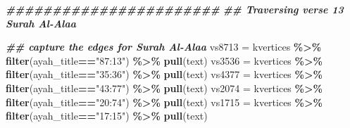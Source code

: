 \documentclass[
]{article}
\newenvironment{Shaded}{\begin{snugshade}}{\end{snugshade}}
\newcommand{\DocumentationTok}[1]{\textcolor[rgb]{0.56,0.35,0.01}{\textbf{\textit{#1}}}}
\newcommand{\FunctionTok}[1]{\textcolor[rgb]{0.13,0.29,0.53}{\textbf{#1}}}
\newcommand{\NormalTok}[1]{#1}
\newcommand{\OtherTok}[1]{\textcolor[rgb]{0.56,0.35,0.01}{#1}}
\newcommand{\SpecialCharTok}[1]{\textcolor[rgb]{0.81,0.36,0.00}{\textbf{#1}}}
\newcommand{\StringTok}[1]{\textcolor[rgb]{0.31,0.60,0.02}{#1}}
\begin{document}
\begin{Shaded}
\begin{Highlighting}[]
\DocumentationTok{\#\#\#\#\#\#\#\#\#\#\#\#\#\#\#\#\#\#\#\#\#\#\#}
\DocumentationTok{\#\# Traversing verse 13 Surah Al{-}A\textquotesingle{}laa }

\DocumentationTok{\#\# capture the edges for Surah Al{-}A\textquotesingle{}laa}
\NormalTok{vs8713 }\OtherTok{=}\NormalTok{ kvertices }\SpecialCharTok{\%\textgreater{}\%} \FunctionTok{filter}\NormalTok{(ayah\_title}\SpecialCharTok{==}\StringTok{"87:13"}\NormalTok{) }\SpecialCharTok{\%\textgreater{}\%} \FunctionTok{pull}\NormalTok{(text)}
\NormalTok{vs3536 }\OtherTok{=}\NormalTok{ kvertices }\SpecialCharTok{\%\textgreater{}\%} \FunctionTok{filter}\NormalTok{(ayah\_title}\SpecialCharTok{==}\StringTok{"35:36"}\NormalTok{) }\SpecialCharTok{\%\textgreater{}\%} \FunctionTok{pull}\NormalTok{(text)}
\NormalTok{vs4377 }\OtherTok{=}\NormalTok{ kvertices }\SpecialCharTok{\%\textgreater{}\%} \FunctionTok{filter}\NormalTok{(ayah\_title}\SpecialCharTok{==}\StringTok{"43:77"}\NormalTok{) }\SpecialCharTok{\%\textgreater{}\%} \FunctionTok{pull}\NormalTok{(text)}
\NormalTok{vs2074 }\OtherTok{=}\NormalTok{ kvertices }\SpecialCharTok{\%\textgreater{}\%} \FunctionTok{filter}\NormalTok{(ayah\_title}\SpecialCharTok{==}\StringTok{"20:74"}\NormalTok{) }\SpecialCharTok{\%\textgreater{}\%} \FunctionTok{pull}\NormalTok{(text)}
\NormalTok{vs1715 }\OtherTok{=}\NormalTok{ kvertices }\SpecialCharTok{\%\textgreater{}\%} \FunctionTok{filter}\NormalTok{(ayah\_title}\SpecialCharTok{==}\StringTok{"17:15"}\NormalTok{) }\SpecialCharTok{\%\textgreater{}\%} \FunctionTok{pull}\NormalTok{(text)}


\end{Highlighting}
\end{Shaded}
\end{document}
